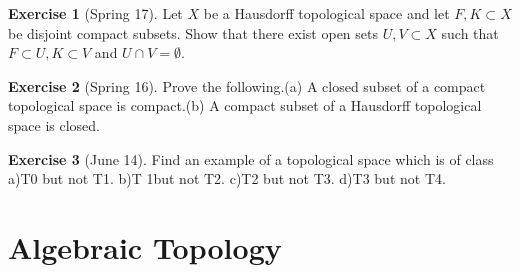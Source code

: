 \documentclass[12pt]{book}
\theoremstyle{definition}
\newtheorem{ex}{Exercise}
\begin{document}
	\begin{ex}[Spring 17]
		Let $X$ be a Hausdorff topological space and let $F,K\subset X$ be disjoint
		 compact subsets.  Show that there exist open sets $U,V\subset X$ such
		  that $F\subset U,K\subset V$ and $U\cap V=\emptyset$.
	\end{ex}

	\begin{ex}[Spring 16]
		Prove the following.(a)  A closed subset of a compact topological space is compact.(b)  A compact subset of a Hausdorff topological space is closed.
	\end{ex}

	\begin{ex}[June 14]
		Find an example of a topological space which is of class a)T0 but not T1. b)T 1but not T2. c)T2 but not T3. d)T3 but not T4.
	\end{ex}
	\chapter{Algebraic Topology}
	
\end{document}
